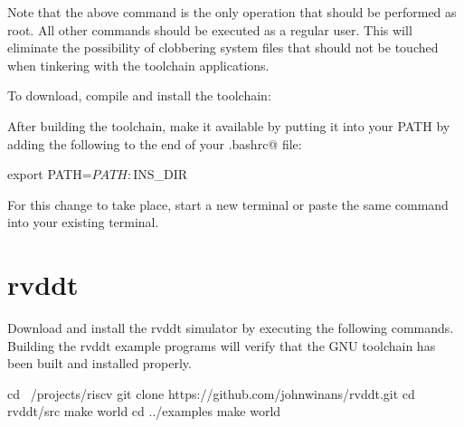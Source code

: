 Note that the above \verb@apt@ command is the only operation that should
be performed as root.  All other commands should be executed as a regular
user.  This will eliminate the possibility of clobbering system files that
should not be touched when tinkering with the toolchain applications.

%
To download, compile and install the toolchain:

\begin{minipage}{\textwidth}
\end{minipage}

After building the toolchain, make it available by putting it into
your PATH by adding the following to the end of your \verb@.bashrc@ file:

\begin{tty}
export PATH=$PATH:$INS_DIR
\end{tty}

For this \verb@PATH@ change to take place, start a new terminal or paste the
same \verb@export@ command into your existing terminal.



\section{rvddt}

Download and install the rvddt simulator by executing the following
commands.
Building the rvddt example programs will verify that the GNU toolchain
has been built and installed properly.

\begin{minipage}{\textwidth}
\begin{tty}
cd ~/projects/riscv
git clone https://github.com/johnwinans/rvddt.git
cd rvddt/src
make world
cd ../examples
make world
\end{tty}
\end{minipage}

